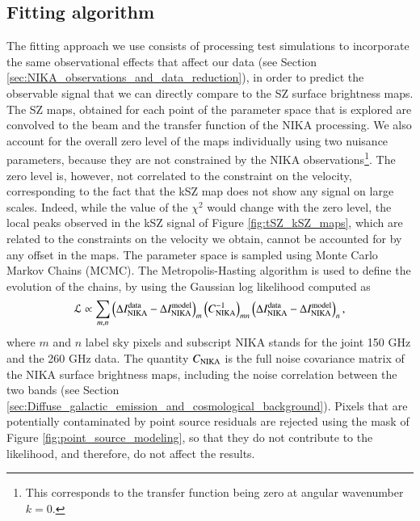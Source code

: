 \documentclass[twocolumn,traditabstract]{aa}
\begin{document}
\subsection{Fitting algorithm}\label{sec:Fitting_algorithm}
The fitting approach we use consists of processing test simulations to incorporate the same observational effects that affect our data (see Section \ref{sec:NIKA_observations_and_data_reduction}), in order to predict the observable signal that we can directly compare to the SZ surface brightness maps. The SZ maps, obtained for each point of the parameter space that is explored are convolved to the beam and the transfer function of the NIKA processing. We also account for the overall zero level of the maps individually using two nuisance parameters, because they are not constrained by the NIKA observations\footnote{This corresponds to the transfer function being zero at angular wavenumber $k=0$.}. The zero level is, however, not correlated to the constraint on the velocity, corresponding to the fact that the kSZ map does not show any signal on large scales. Indeed, while the value of the $\chi^2$ would change with the zero level, the local peaks observed in the kSZ signal of Figure \ref{fig:tSZ_kSZ_maps}, which are related to the constraints on the velocity we obtain, cannot be accounted for by any offset in the maps. The parameter space is sampled using Monte Carlo Markov Chains (MCMC). The Metropolis-Hasting algorithm \citep[e.g.,][]{Chib1995} is used to define the evolution of the chains, by using the Gaussian log likelihood computed as
\begin{equation}
\mathcal{L} \propto \sum\limits_{m,n} \left(\Delta I_{\rm NIKA}^{\rm data} - \Delta I_{\rm NIKA}^{\rm model}\right)_m \left(C_{\rm NIKA}^{-1}\right)_{mn} \left(\Delta I_{\rm NIKA}^{\rm data} - \Delta I_{\rm NIKA}^{\rm model}\right)_n,
\label{eq:likelihood1}
\end{equation}
where $m$ and $n$ label sky pixels and subscript NIKA stands for the joint 150 GHz and the 260 GHz data. The quantity $C_{\rm NIKA}$ is the full noise covariance matrix of the NIKA surface brightness maps, including the noise correlation between the two bands (see Section \ref{sec:Diffuse_galactic_emission_and_cosmological_background}). Pixels that are potentially contaminated by point source residuals are rejected using the mask of Figure \ref{fig:point_source_modeling}, so that they do not contribute to the likelihood, and therefore, do not affect the results.
\end{document}

